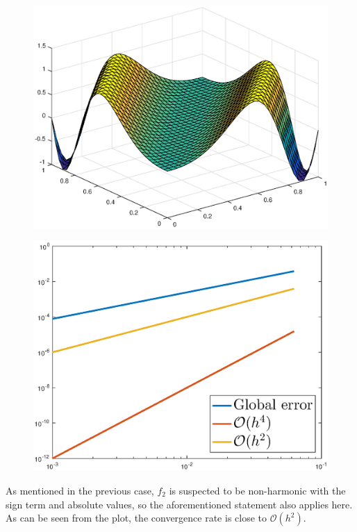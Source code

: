 \documentclass[main.tex]{subfiles}
\begin{document}
\begin{figure}[h]
\centering
\begin{minipage}{.45\textwidth}
  \centering
  \includegraphics[width=.9\linewidth]{../Figures/ex2u2calc}
  \label{fig:ex2:u2calc}
\end{minipage}\hfill%
\begin{minipage}{.45\textwidth}
  \centering
  \includegraphics[width=.9\linewidth]{../Figures/ex2u2err}
  \label{fig:ex2:u2err}
\end{minipage}
\end{figure}

As mentioned in the previous case, $f_2$ is suspected to be non-harmonic with the sign term and absolute values, so the aforementioned statement also applies here. As can be seen from the plot, the convergence rate is close to $\mathcal{O}(h^2)$.
\end{document}
